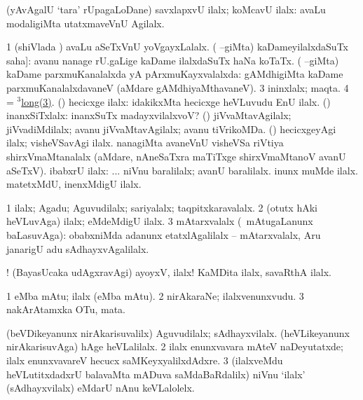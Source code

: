 \bentry
{}
\gl{\kirxvi}
\bmng
(yAvAgalU `tara' rUpagaLoDane) savxlapxvU ilalx; koMcavU ilalx:  avaLu modaligiMta utatxmaveVnU Agilalx. 
\emng

\noindent
\gl{\pagu}
\bmng
\bnum
\num{1}  (shiVlada \vi) avaLu aSeTxVnU yoVgayxLalalx. 
 ( --giMta) 
\banum
{} kaDameyilalxdaSuTx \eng{[is no less than} saha]:  avanu nanage  rU.gaLige kaDame ilalxdaSuTx haNa koTaTx. 
 ( --giMta) kaDame parxmuKanalalxda yA pArxmuKayxvalalxda:  gAMdhigiMta kaDame parxmuKanalalxdavaneV (aMdare gAMdhiyaMthavaneV). 
\eanum
\numie
\num{3}  ininxlalx; maqta. 
\num{4}  = \hyperref{kandict_l.pdf}{L}{long(3)3}{$^3$long(3)}. 
  
\banum
{} (\nA) hecicxge ilalx:  idakikxMta hecicxge heVLuvudu EnU ilalx. 
 (\gu) inanxSiTxlalx:  inanxSuTx madayxvilalxvoV? 
 (\kirxvi) jiVvaMtavAgilalx; jiVvadiMdilalx;  avanu jiVvaMtavAgilalx; avanu tiVrikoMDa. 
 (\kirxvi) hecicxgeyAgi ilalx; visheVSavAgi ilalx.  nanagiMta avaneVnU visheVSa riVtiya shirxVmaMtanalalx (aMdare, nAneSaTxra maTiTxge shirxVmaMtanoV avanU aSeTxV). 
 ibabxrU ilalx: ... niVnu baralilalx; avanU baralilalx. 
 inunx muMde ilalx. 
 matetxMdU, inenxMdigU ilalx. 
\eanum
\numie
\enum
\emng
\eentry

\bentry
{}
\gl{\kirxvi}
\bmng
\bnum
\num{1} ilalx; Agadu; Aguvudilalx; sariyalalx; taqpitxkaravalalx. 
\num{2} (otutx hAki heVLuvAga) ilalx; eMdeMdigU ilalx. 
\num{3} mAtarxvalalx (\mo\ mAtugaLanunx baLasuvAga):  obabxniMda adanunx etatxlAgalilalx -- mAtarxvalalx, Aru janarigU adu sAdhayxvAgalilalx. 
\enum
\emng

\noindent
\gl{\pagu}
\bmng
{}! 
\banum
{} (BayasUcaka udAgxravAgi) ayoyxV, ilalx! 
 KaMDita ilalx, savaRthA ilalx. 
\eanum
\emng
\eentry

\bentry
{}
\gl{\nA}
\bmng
\bnum
\num{1}  eMba mAtu; ilalx (eMba mAtu). 
\num{2} nirAkaraNe; ilalxvenunxvudu. 
\num{3} nakArAtamxka OTu, mata. 
\enum
\emng

\noindent
\gl{\pagu}
\bmng
\bnum
{}  
\banum
{} (beVDikeyanunx nirAkarisuvalilx) Aguvudilalx; sAdhayxvilalx. 
 (heVLikeyanunx nirAkarisuvAga) hAge heVLalilalx. 
\eanum
\numie
\num{2}  ilalx enunxvavara mAteV naDeyutatxde; ilalx enunxvavareV hecucx saMKeyxyalilxdAdxre. 
\num{3} (ilalxveMdu heVLutitxdadxrU balavaMta mADuva saMdaBaRdalilx) niVnu `ilalx' (sAdhayxvilalx) eMdarU nAnu keVLalolelx. 
\enum
\emng
\eentry

